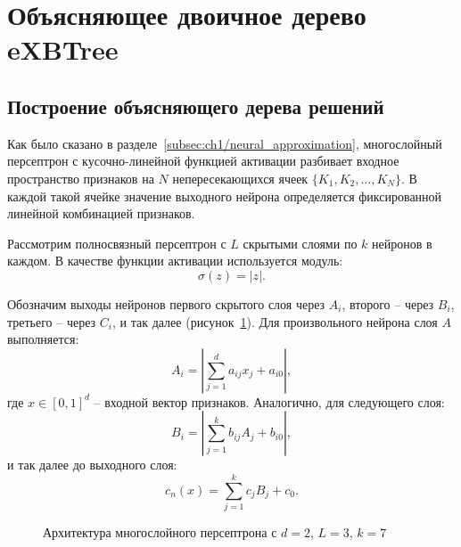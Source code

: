 \section{Объясняющее двоичное дерево eXBTree}\label{sec:ch1/exbtree}

\subsection{Построение объясняющего дерева решений}

Как было сказано в разделе~\cref{subsec:ch1/neural_approximation}, многослойный персептрон с кусочно-линейной функцией активации разбивает входное пространство признаков на \(N\) непересекающихся ячеек \(\{K_1, K_2, \ldots, K_N\}\). В каждой такой ячейке значение выходного нейрона определяется фиксированной линейной комбинацией признаков.

Рассмотрим полносвязный персептрон с \(L\) скрытыми слоями по \(k\) нейронов в каждом. В качестве функции активации используется модуль: 
\[
\sigma(z) = |z|.
\]

Обозначим выходы нейронов первого скрытого слоя через \(A_i\), второго -- через \(B_i\), третьего -- через \(C_i\), и так далее (рисунок~\cref{fig:perceptron_architecture}). Для произвольного нейрона слоя \(A\) выполняется:
\[
A_i = \left| \sum_{j=1}^{d} a_{ij} x_j + a_{i0} \right|,
\]
где \( x \in [0, 1]^d \) -- входной вектор признаков. Аналогично, для следующего слоя:
\[
B_i = \left| \sum_{j=1}^{k} b_{ij} A_j + b_{i0} \right|,
\]
и так далее до выходного слоя:
\[
    c_n(x) = \sum_{j=1}^{k} c_{j} B_j + c_{0}.
\]

\begin{figure}[ht]
    \caption{Архитектура многослойного персептрона с \(d=2\), \(L=3\), \(k=7\)}
    \label{fig:perceptron_architecture}
\end{figure}


